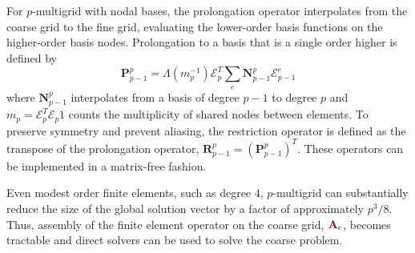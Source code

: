 For $p$-multigrid with nodal bases, the prolongation operator interpolates from the coarse grid to the fine grid, evaluating the lower-order basis functions on the higher-order basis nodes.
Prolongation to a basis that is a single order higher is defined by
\begin{equation}
\mathbf{P}_{p - 1}^p = \Lambda \left( m_p^{-1} \right) \mathcal{E}_p^T \sum_e \mathbf{N}_{p - 1}^p \mathcal{E}^e_{p - 1}
\label{mg_prolong}
\end{equation}
where $\mathbf{N}_{p - 1}^p$ interpolates from a basis of degree $p - 1$ to degree $p$ and $m_p = \mathcal{E}_p^T \mathcal{E}_p 1$ counts the multiplicity of shared nodes between elements.
To preserve symmetry and prevent aliasing, the restriction operator is defined as the transpose of the prolongation operator, $\mathbf{R}_{p - 1}^p = \left( \mathbf{P}_{p - 1}^p \right)^T$.
These operators can be implemented in a matrix-free fashion.

Even modest order finite elements, such as degree $4$, $p$-multigrid can substantially reduce the size of the global solution vector by a factor of approximately $p^3 / 8$.
Thus, assembly of the finite element operator on the coarse grid, ${\color{burgundy}\mathbf{A}}_c$, becomes tractable and direct solvers can be used to solve the coarse problem.

